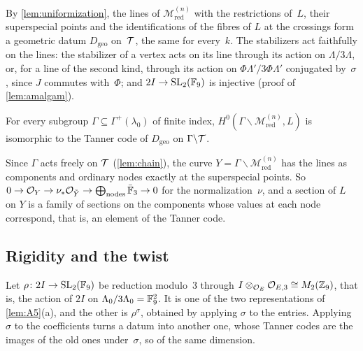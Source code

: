 By \cref{lem:uniformization}, the lines of $\mathcal M^{(n)}_{\mathrm{red}}$ with the restrictions of~$L$, their
superspecial points and the identifications of the fibres of $L$ at the crossings form a geometric datum $D_{\mathrm{geo}}$
on~$\mathcal{T}$, the same for every~$k$. The stabilizers act faithfully on the lines: the stabilizer of a vertex acts on its
line through its action on $\Lambda/3\Lambda$, or, for a line of the second kind, through its action on
$\Phi\Lambda'/3\Phi\Lambda'$ conjugated by~$\sigma$, since $J$ commutes with~$\Phi$; and $2I\to\operatorname{SL}_2(\mathbb{F}_9)$ is injective (proof
of \cref{lem:amalgam}).

\begin{lemma}\label{lem:sections}
\notformalized
For every subgroup $\Gamma\subseteq\Gamma^+(\lambda_0)$ of finite index, $H^0(\Gamma\backslash\mathcal M^{(n)}_{\mathrm{red}},L)$
is isomorphic to the Tanner code of $D_{\mathrm{geo}}$ on $\Gamma\backslash\mathcal{T}$.
\end{lemma}
\begin{informalproof}
Since $\Gamma$ acts freely on $\mathcal{T}$ (\cref{lem:chain}), the curve $Y=\Gamma\backslash\mathcal M^{(n)}_{\mathrm{red}}$ has
the lines as components and ordinary nodes exactly at the superspecial points. So
$0\to\mathcal{O}_Y\to\nu_*\mathcal{O}_{\tilde Y}\to\bigoplus_{\text{nodes}}\bar{\mathbb{F}}_3\to0$ for the normalization~$\nu$, and a section of $L$
on $Y$ is a family of sections on the components whose values at each node correspond, that is, an element of the Tanner
code.
\end{informalproof}

\subsection{Rigidity and the twist}\label{sec:rigidity}

Let $\rho\colon2I\to\operatorname{SL}_2(\mathbb{F}_9)$ be reduction modulo~$3$ through $I\otimes_{\mathcal{O}_E}\mathcal{O}_{E,3}\cong M_2(\mathbb{Z}_9)$, that is, the
action of $2I$ on $\Lambda_0/3\Lambda_0=\mathbb{F}_9^2$. It is one of the two representations of \cref{lem:A5}(a), and the other
is $\rho^\sigma$, obtained by applying $\sigma$ to the entries. Applying $\sigma$ to the coefficients turns a datum into
another one, whose Tanner codes are the images of the old ones under~$\sigma$, so of the same dimension.

